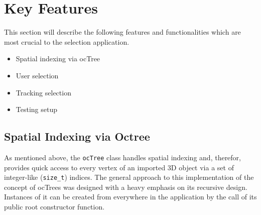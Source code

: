 \section{Key Features}
\label{sec:key_features}
This section will describe the following features and functionalities which are most crucial to the selection application.

\begin{itemize}  
	\item Spatial indexing via ocTree
	\item User selection
	\item Tracking selection
	\item Testing setup 
\end{itemize}

\subsection{Spatial Indexing via Octree}
\label{sec:spatial_indexing_via_octree}

As mentioned above, the \texttt{ocTree} class handles spatial indexing and, therefor, provides quick access to every vertex of an imported 3D object via a set of integer-like (\texttt{size\_t}) indices. The general approach to this implementation of the concept of ocTrees was designed with a heavy emphasis on its recursive design. Instances of it can be created from everywhere in the application by the call of its public root constructor function.

